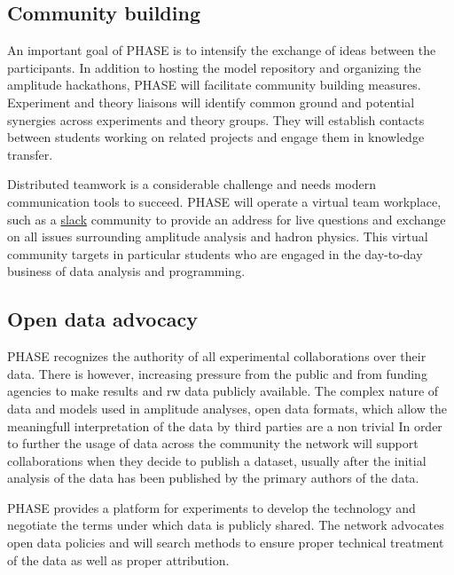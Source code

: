 \subsection{Community building}
\label{sec:community}
An important goal of PHASE is to intensify the exchange of ideas between the participants. In addition to hosting the model repository and organizing the amplitude hackathons, PHASE will facilitate community building measures. Experiment and theory liaisons will identify common ground and potential synergies across experiments and theory groups. They will establish contacts between students working on related projects and engage them in knowledge transfer.

Distributed teamwork is a considerable challenge and needs modern communication tools to succeed. PHASE will operate a virtual team workplace, such as a \href{http://slack.com}{slack} community to provide an address for live questions and exchange on all issues surrounding amplitude analysis and hadron physics. This virtual community targets in particular students who are engaged in the day-to-day business of data analysis and programming.

\subsection{Open data advocacy}
\label{sec:opendata}
PHASE recognizes the authority of all experimental collaborations over their data. There is however, increasing pressure from the public and from  funding agencies to make results and rw data publicly available. The complex nature of data and models used in amplitude analyses, open data formats, which allow the meaningfull interpretation of the data by third parties are a non trivial  In order to further the usage of data across the community the network will support collaborations when they decide to publish a dataset, usually after the initial analysis of the data has been published by the primary authors of the data. 

PHASE provides a platform for experiments to develop the technology and negotiate the terms under which data is publicly shared. The network advocates open data policies and will search methods to ensure proper technical treatment of the data as well as proper attribution.


